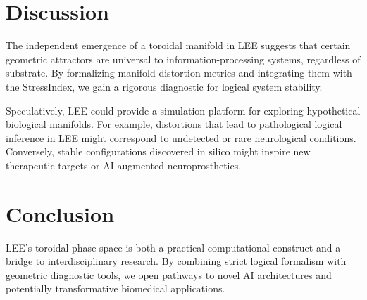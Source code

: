 \documentclass[12pt]{article}
\begin{document}
\section{Discussion}
The independent emergence of a toroidal manifold in LEE suggests that certain geometric attractors are universal to information-processing systems, regardless of substrate. 
By formalizing manifold distortion metrics and integrating them with the StressIndex, we gain a rigorous diagnostic for logical system stability.

Speculatively, LEE could provide a simulation platform for exploring hypothetical biological manifolds. 
For example, distortions that lead to pathological logical inference in LEE might correspond to undetected or rare neurological conditions. 
Conversely, stable configurations discovered in silico might inspire new therapeutic targets or AI-augmented neuroprosthetics.

\section{Conclusion}
LEE's toroidal phase space is both a practical computational construct and a bridge to interdisciplinary research. 
By combining strict logical formalism with geometric diagnostic tools, we open pathways to novel AI architectures and potentially transformative biomedical applications.



\end{document}

